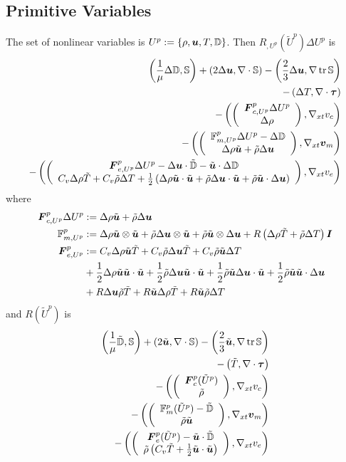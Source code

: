 \documentclass{article}
\begin{document}
\subsection*{Primitive Variables}
The set of nonlinear variables is $U^p:=\left\{ \rho,\boldsymbol u,T,\mathbb{D} \right\}$.
Then $R_{,U^p}(\tilde U^p)\Delta U^p$ is
\begin{align*}
	\left( \frac{1}{\mu}\Delta\mathbb{D},\mathbb{S} \right)+\left( 2\Delta\boldsymbol u,\nabla\cdot\mathbb{S} \right)-\left( \frac{2}{3}\Delta\boldsymbol u,\nabla\operatorname*{tr}{\mathbb{S}} \right)\\
	-\left( \Delta T,\nabla\cdot\boldsymbol\tau \right)\\
	-\left( \left( \begin{array}{c} \boldsymbol F^p_{c,U^p}\Delta U^p\\ \Delta\rho\\ \end{array} \right),\nabla_{xt} v_c \right)\\
	-\left( \left( \begin{array}{c} \mathbb{F}^p_{m,U^p}\Delta U^p-\Delta\mathbb{D}\\ \Delta\rho\tilde{\boldsymbol u}+\tilde\rho\Delta\boldsymbol u\\ \end{array} \right),\nabla_{xt}\boldsymbol v_m \right)\\
	-\left( \left( \begin{array}{c} \boldsymbol F^p_{e,U^p}\Delta U^p-\Delta\boldsymbol u\cdot\tilde{\mathbb{D}}-\tilde{\boldsymbol u}\cdot\Delta\mathbb{D}\\ C_v\Delta\rho\tilde T+C_v\tilde\rho\Delta T
	+\frac{1}{2}\left( \Delta\rho\tilde{\boldsymbol u}\cdot\tilde{\boldsymbol u}+\tilde\rho\Delta\boldsymbol u\cdot\tilde{\boldsymbol u}+\tilde\rho\tilde{\boldsymbol u}\cdot\Delta\boldsymbol u \right)\\ \end{array} \right),\nabla_{xt} v_e \right)
\end{align*}
where
\begin{align*}
\boldsymbol F^p_{c,U^p}\Delta U^p&:=\Delta\rho\tilde{\boldsymbol u}+\tilde\rho\Delta\boldsymbol u\\
\mathbb{F}^p_{m,U^p}&:=\Delta\rho\tilde{\boldsymbol u}\otimes\tilde{\boldsymbol u}+\tilde\rho\Delta\boldsymbol u\otimes\tilde{\boldsymbol u}+\tilde\rho\tilde{\boldsymbol u}\otimes\Delta\boldsymbol u
+R\left( \Delta\rho\tilde T+\tilde\rho\Delta T \right)\boldsymbol I\\
\boldsymbol F^p_{e,U^p}&:=C_v\Delta\rho\tilde{\boldsymbol u}\tilde T+C_v\tilde\rho\Delta\boldsymbol u\tilde T+C_v\tilde\rho\tilde{\boldsymbol u}\Delta T\\
&+\frac{1}{2}\Delta\rho\tilde{\boldsymbol u}\tilde{\boldsymbol u}\cdot\tilde{\boldsymbol u}
+\frac{1}{2}\tilde\rho\Delta\boldsymbol u\tilde{\boldsymbol u}\cdot\tilde{\boldsymbol u}
+\frac{1}{2}\tilde\rho\tilde{\boldsymbol u}\Delta\boldsymbol u\cdot\tilde{\boldsymbol u}
+\frac{1}{2}\tilde\rho\tilde{\boldsymbol u}\tilde{\boldsymbol u}\cdot\Delta\boldsymbol u\\
&+R\Delta\boldsymbol u\tilde\rho\tilde T
+R\tilde{\boldsymbol u}\Delta\rho\tilde T
+R\tilde{\boldsymbol u}\tilde\rho\Delta T
\end{align*}
and $R(\tilde U^p)$ is
\begin{align*}
	\left( \frac{1}{\mu}\tilde{\mathbb{D}},\mathbb{S} \right)+\left( 2\tilde{\boldsymbol u},\nabla\cdot\mathbb{S} \right)-\left( \frac{2}{3}\tilde{\boldsymbol u},\nabla\operatorname*{tr}{\mathbb{S}} \right)\\
	-\left( \tilde T,\nabla\cdot\boldsymbol\tau \right)\\
	-\left( \left( \begin{array}{c} \boldsymbol F^p_c(\tilde U^p)\\ \tilde\rho\\ \end{array} \right),\nabla_{xt} v_c \right)\\
	-\left( \left( \begin{array}{c} \mathbb{F}^p_m(\tilde U^p)-\tilde{\mathbb{D}}\\ \tilde\rho\tilde{\boldsymbol u}\\ \end{array} \right),\nabla_{xt}\boldsymbol v_m \right)\\
	-\left( \left( \begin{array}{c} \boldsymbol F^p_e(\tilde U^p)-\tilde{\boldsymbol u}\cdot\tilde{\mathbb{D}}\\ \tilde\rho\left( C_v\tilde T+\frac{1}{2}\tilde{\boldsymbol u}\cdot\tilde{\boldsymbol u} \right)\\ \end{array} \right),\nabla_{xt} v_e \right)
\end{align*}
\end{document}
